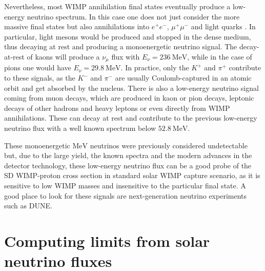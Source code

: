 Nevertheless, most WIMP annihilation final states eventually produce a low-energy neutrino spectrum.  In this case one does not just consider the more massive final states but also annihilations into $e^{+}e^{-}$, $\mu^{+}\mu^{-}$ and light quarks \cite{Bernal2012}. In particular, light mesons would be produced and stopped in the dense medium, thus decaying at rest and producing a monoenergetic neutrino signal. The decay-at-rest of kaons will produce a $\nu_{\mu}$ flux with $E_{\nu} = 236 ~ \mathrm{MeV}$, while in the case of pions one would have $E_{\nu}  = 29.8 ~ \mathrm{MeV}$. In practice, only the $K^{+}$ and $\pi^{+}$ contribute to these signals, as the $K^{-}$ and $\pi^{-}$ are usually Coulomb-captured in an atomic orbit and get absorbed by the nucleus. There is also a low-energy neutrino signal coming from muon decays, which are produced in kaon or pion decays, leptonic decays of other hadrons and heavy leptons or even directly from WIMP annihilations. These can decay at rest and contribute to the previous low-energy neutrino flux with a well known spectrum below $52.8 ~ \mathrm{MeV}$.

These monoenergetic $\mathrm{MeV}$ neutrinos were previously considered undetectable but, due to the large yield, the known spectra and the modern advances in the detector technology, these low-energy neutrino flux can be a good probe of the SD WIMP-proton cross section in standard solar WIMP capture scenario, as it is sensitive to low WIMP masses and insensitive to the particular final state. A good place to look for these signals are next-generation neutrino experiments such as DUNE.

\section{Computing limits from solar neutrino fluxes}
\label{sec:dm_analysis_limits}

